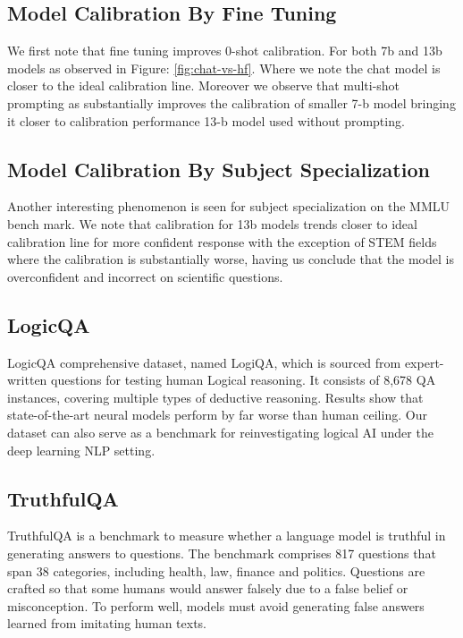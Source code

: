 \documentclass[11pt]{article}
\begin{document}
\subsection{Model Calibration By Fine Tuning}  

We first note that fine tuning improves 0-shot calibration. For both 7b and 13b models as observed in 
Figure: \ref{fig:chat-vs-hf}. Where we note the chat model is closer to the ideal calibration line. Moreover we observe that 
multi-shot prompting as substantially improves the calibration of smaller 7-b model bringing it closer to calibration performance 13-b model used without prompting.


\subsection{Model Calibration By Subject Specialization}  

Another interesting phenomenon is seen for subject specialization on the MMLU bench mark. We note that calibration for 13b models  trends closer to ideal calibration line for more confident response with the exception of STEM fields where the calibration is substantially worse, having us conclude that the model 
is overconfident and incorrect on scientific questions.

\subsection{LogicQA}

LogicQA comprehensive dataset, named LogiQA, which is sourced from expert-written questions for testing human Logical reasoning. It consists of 8,678 QA instances, covering multiple types of deductive reasoning. Results show that state-of-the-art neural models perform by far worse than human ceiling. Our dataset can also serve as a benchmark for reinvestigating logical AI under the deep learning NLP setting. 


\subsection{TruthfulQA}

TruthfulQA is a benchmark to measure whether a language model is truthful in generating answers to questions. The benchmark comprises 817 questions that span 38 categories, including health, law, finance and politics. Questions are crafted so that some humans would answer falsely due to a false belief or misconception. To perform well, models must avoid generating false answers learned from imitating human texts.
\end{document}
